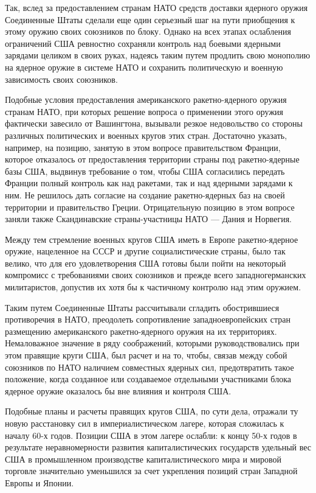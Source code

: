\documentclass[12pt, a4paper, openany]{book}
\begin{document}
Так, вслед за предоставлением странам НАТО средств доставки ядерного оружия Соединенные Штаты сделали еще один серьезный шаг на пути приобщения к этому оружию своих союзников по блоку. Однако на всех этапах ослабления ограничений США ревностно сохраняли контроль над боевыми ядерными зарядами целиком в своих руках, надеясь таким путем продлить свою монополию на ядерное оружие в системе НАТО и сохранить политическую и военную зависимость своих союзников.
	
Подобные условия предоставления американского ракетно-ядерного оружия странам НАТО, при которых решение вопроса о применении этого оружия фактически завесило от Вашингтона, вызывали резкое недовольство со стороны различных политических и военных кругов этих стран. Достаточно указать, например, на позицию, занятую в этом вопросе правительством Франции, которое отказалось от предоставления территории страны под ракетно-ядерные базы США, выдвинув требование о том, чтобы США согласились передать Франции полный контроль как над ракетами, так и над ядерными зарядами к ним. Не решилось дать согласие на создание ракетно-ядерных баз на своей территории и правительство Греции. Отрицательную позицию в этом вопросе заняли также Скандинавские страны-участницы НАТО — Дания и Норвегия.
	
Между тем стремление военных кругов США иметь в Европе ракетно-ядерное оружие, нацеленное на СССР и другие социалистические страны, было так велико, что для его удовлетворения США готовы были пойти на некоторый компромисс с требованиями своих союзников и прежде всего западногерманских милитаристов, допустив их хотя бы к частичному контролю над этим оружием.
	
Таким путем Соединенные Штаты рассчитывали сгладить обострившиеся противоречия в НАТО, преодолеть сопротивление западноевропейских стран размещению американского ракетно-ядерного оружия на их территориях. Немаловажное значение в ряду соображений, которыми руководствовались при этом правящие круги США, был расчет и на то, чтобы, связав между собой союзников по НАТО наличием совместных ядерных сил, предотвратить такое положение, когда созданное или создаваемое отдельными участниками блока ядерное оружие оказалось бы вне влияния и контроля США.
	
Подобные планы и расчеты правящих кругов США, по сути дела, отражали ту новую расстановку сил в империалистическом лагере, которая сложилась к началу 60-х годов. Позиции США в этом лагере ослабли: к концу 50-х годов в результате неравномерности развития капиталистических государств удельный вес США в промышленном производстве капиталистического мира и мировой торговле значительно уменьшился за счет укрепления позиций стран Западной Европы и Японии.
	
\end{document}
